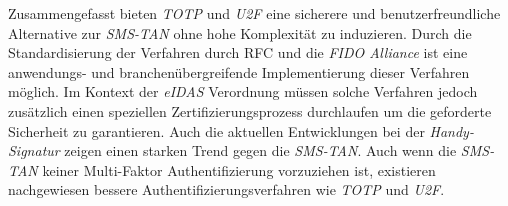 \documentclass[11pt,a4paper,ngerman]{scrreprt}
\begin{document}
Zusammengefasst bieten \textit{TOTP} und \textit{U2F} eine sicherere und benutzerfreundliche Alternative zur \textit{SMS-TAN} ohne hohe Komplexität zu induzieren. Durch die Standardisierung der Verfahren durch RFC und die \textit{FIDO Alliance} ist eine anwendungs- und branchenübergreifende Implementierung dieser Verfahren möglich. Im Kontext der \textit{eIDAS} Verordnung müssen solche Verfahren jedoch zusätzlich einen speziellen Zertifizierungsprozess durchlaufen um die geforderte Sicherheit zu garantieren. Auch die aktuellen Entwicklungen bei der \textit{Handy-Signatur} zeigen einen starken Trend gegen die \textit{SMS-TAN}. Auch wenn die \textit{SMS-TAN} keiner Multi-Faktor Authentifizierung vorzuziehen ist, existieren nachgewiesen bessere Authentifizierungsverfahren wie \textit{TOTP} und \textit{U2F}.



\end{document}
